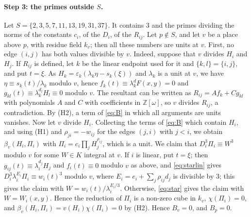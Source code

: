 \documentclass[11pt]{article}
\newcommand{\Z}{\mathbb{Z}}
\begin{document}
\paragraph{Step 3: the primes outside $S$.} Let $S=\{2,3,5,7,11,13,19,31,37\}$. It contains $3$ and the primes dividing the norms of the constants $c_i$, of the $D_i$, of the $R_{ij}$. Let $p\notin S$, and let $v$ be a place above $p$, with residue field $k_v$; then all these numbers are units at $v$. First, no edge $(i,j)$ has both values divisible by $v$. Indeed, suppose that $v$ divides $H_i$ and $H_j$. If $R_{ij}$ is defined, let $k$ be the linear endpoint used for it and $\{k,l\}=\{i,j\}$, and put $t=\xi$. As $H_k=\varepsilon_k(\lambda_k\eta-s_k(\xi))$ and $\lambda_k$ is a unit at $v$, we have $\eta\equiv s_k(t)/\lambda_k$ modulo $v$, hence $f_k(t)\equiv\lambda_k^dF(x,y)=0$ and $g_{kl}(t)\equiv\lambda_k^{d_l}H_l\equiv0$ modulo $v$. The resultant can be written as $R_{ij}=Af_k+Cg_{kl}$ with polynomials $A$ and $C$ with coefficients in $\Z[\omega]$, so $v$ divides $R_{ij}$, a contradiction. By (H2), a term of \eqref{eq:B} in which all arguments are units vanishes. Now let $v$ divide $H_i$. Collecting the terms of \eqref{eq:B} which contain $H_i$, and using (H1) and $\rho_{ji}=-w_{ij}$ for the edges $(j,i)$ with $j<i$, we obtain $\beta_v(H_i,\Pi_i)$ with $\Pi_i=c_i\prod_jH_j^{\rho_{ij}}$, which is a unit. We claim that $D_i^3\Pi_i\equiv W^3$ modulo $v$ for some $W\in K$ integral at $v$. If $i$ is linear, put $t=\xi$; then $g_{ij}(t)\equiv\lambda_i^{d_j}H_j$ and $f_i(t)\equiv0$ modulo $v$ as above, and \eqref{eq:starlin} gives $D_i^3\lambda_i^{E_i}\Pi_i\equiv w_i(t)^3$ modulo $v$, where $E_i=e_i+\sum_j\rho_{ij}d_j$ is divisible by $3$; this gives the claim with $W=w_i(t)/\lambda_i^{E_i/3}$. Otherwise, \eqref{eq:star} gives the claim with $W=W_i(x,y)$. Hence the reduction of $\Pi_i$ is a non-zero cube in $k_v$, $\chi(\Pi_i)=0$, and $\beta_v(H_i,\Pi_i)=v(H_i)\chi(\Pi_i)=0$ by (H2). Hence $B_v=0$, and $B_p=0$.
\end{document}
